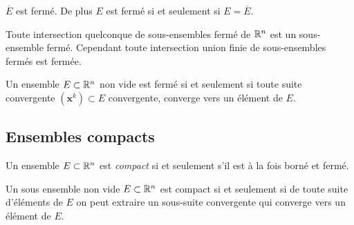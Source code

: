 \begin{proposition}
	$\overline E$ est fermé. De plus $E$ est fermé si et seulement si $E = \overline E$.
\end{proposition}


\begin{proposition}
	Toute intersection quelconque de sous-ensembles fermé de $\mathbb{R}^n$ est un sous-ensemble fermé. Cependant toute intersection union finie de sous-ensembles fermés est fermée.
\end{proposition}


\begin{lemme}
	Un ensemble $E \subset \mathbb{R}^n$ non vide est fermé si et seulement si toute suite convergente $(\bm x^k) \subset E$ convergente, converge vers un élément de $E$.
\end{lemme}


\subsection{Ensembles compacts}

\begin{definition}
	Un ensemble $E \subset \mathbb{R}^n$ est \emph{compact} si et seulement s'il est à la fois borné et fermé.
\end{definition}
\begin{theorem} \label{thm: Caractérisation d'un sous-ensemble compact}
	Un sous ensemble non vide $E \subset \mathbb{R}^n$ est compact si et seulement si de toute suite d'éléments de $E$ on peut extraire un sous-suite convergente qui converge vers un élément de $E$.
\end{theorem}


